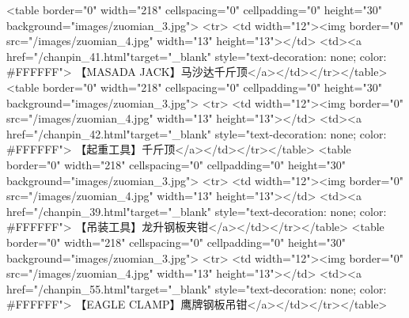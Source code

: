                                                             <table border="0" width="218" cellspacing="0" cellpadding="0" height="30" background="images/zuomian_3.jpg">
                                                                <tr>
                                                                    <td width="12"><img border="0" src="/images/zuomian_4.jpg" width="13" height="13"></td>
                                                                    <td><a href="/chanpin_41.html"target="_blank" style="text-decoration: none; color: #FFFFFF">
                                                                            【MASADA JACK】马沙达千斤顶</a></td></tr></table>
                                                            <table border="0" width="218" cellspacing="0" cellpadding="0" height="30" background="images/zuomian_3.jpg">
                                                                <tr>
                                                                    <td width="12"><img border="0" src="/images/zuomian_4.jpg" width="13" height="13"></td>
                                                                    <td><a href="/chanpin_42.html"target="_blank" style="text-decoration: none; color: #FFFFFF">
                                                                            【起重工具】千斤顶</a></td></tr></table>
                                                            <table border="0" width="218" cellspacing="0" cellpadding="0" height="30" background="images/zuomian_3.jpg">
                                                                <tr>
                                                                    <td width="12"><img border="0" src="/images/zuomian_4.jpg" width="13" height="13"></td>
                                                                    <td><a href="/chanpin_39.html"target="_blank" style="text-decoration: none; color: #FFFFFF">
                                                                            【吊装工具】龙升钢板夹钳</a></td></tr></table>
                                                            <table border="0" width="218" cellspacing="0" cellpadding="0" height="30" background="images/zuomian_3.jpg">
                                                                <tr>
                                                                    <td width="12"><img border="0" src="/images/zuomian_4.jpg" width="13" height="13"></td>
                                                                    <td><a href="/chanpin_55.html"target="_blank" style="text-decoration: none; color: #FFFFFF">
                                                                            【EAGLE CLAMP】鹰牌钢板吊钳</a></td></tr></table>
